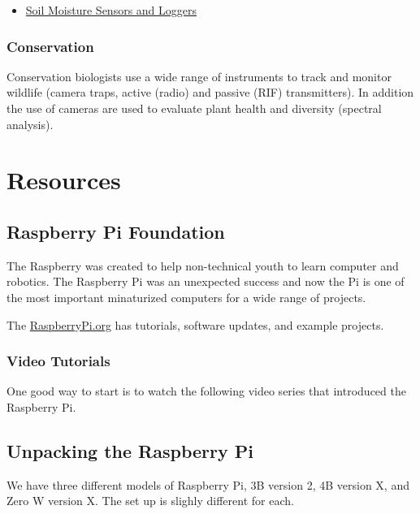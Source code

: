 \documentclass{article}\usepackage[]{graphicx}\usepackage[]{color}
\begin{document}
\begin{itemize}
\item \href{https://fyi.extension.wisc.edu/cropirrigation/files/2015/03/Methods.to_.Monitor.Soil_.Moisture.pdf}{Soil Moisture Sensors and Loggers}
\end{itemize}

\subsubsection{Conservation} 

Conservation biologists use a wide range of instruments to track and monitor wildlife (camera traps, active (radio) and passive (RIF) transmitters). In addition the use of cameras are used to evaluate plant health and diversity (spectral analysis). 



\section{Resources}

\subsection{Raspberry Pi Foundation}

The Raspberry was created to help non-technical youth to learn computer and robotics. The Raspberry Pi was an unexpected success and now the Pi is one of the most important minaturized computers for a wide range of projects.  

The \href{https://www.raspberrypi.org/}{RaspberryPi.org} has tutorials, software updates, and example projects.

\subsubsection{Video Tutorials}

One good way to start is to watch the following video series that introduced the Raspberry Pi. 


\subsection{Unpacking the Raspberry Pi}

We have three different models of Raspberry Pi, 3B version 2, 4B version X, and Zero W version X. The set up is slighly different for each. 
\end{document}

